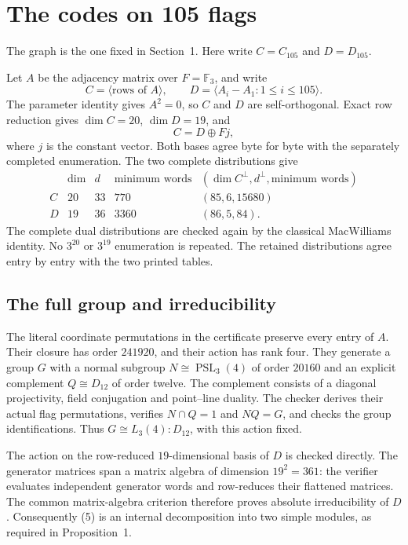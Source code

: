 \section{The codes on 105 flags}

The graph is the one fixed in Section~1. Here write $C=C_{105}$ and
$D=D_{105}$.

Let $A$ be the adjacency matrix over $F=\mathbb F_3$, and write
\[
 C=\langle\text{rows of }A\rangle,
 \qquad D=\langle A_i-A_1:1\leq i\leq105\rangle.
\]
The parameter identity gives $A^2=0$, so $C$ and $D$ are self-orthogonal.
Exact row reduction gives $\dim C=20$, $\dim D=19$, and
\[
 C=D\oplus Fj,                                      \tag{5}
\]
where $j$ is the constant vector. Both bases agree byte for byte with the
separately completed enumeration. The two complete distributions give
\[
\begin{array}{c|rrrr}
 &\dim&d&\text{minimum words}&(\dim C^\perp,d^\perp,\text{minimum words})\\\hline
 C&20&33&770&(85,6,15680)\\
 D&19&36&3360&(86,5,84).
\end{array}
\]
The complete dual distributions are checked again by the classical
MacWilliams identity. No $3^{20}$ or $3^{19}$ enumeration is repeated.
The retained distributions agree entry by entry with the two printed
tables.

\subsection{The full group and irreducibility}
The literal coordinate permutations in the certificate preserve every
entry of $A$. Their closure has order $241920$, and their action has
rank four. They generate a group $G$ with a normal subgroup
$N\cong\operatorname{PSL}_3(4)$ of order $20160$ and an explicit
complement $Q\cong D_{12}$ of order twelve. The complement consists of
a diagonal projectivity, field conjugation and point--line duality.
The checker derives their actual flag permutations, verifies
$N\cap Q=1$ and $NQ=G$, and checks the group identifications.
Thus $G\cong L_3(4):D_{12}$, with this action fixed.

The action on the row-reduced $19$-dimensional basis of $D$ is checked
directly. The generator matrices span a matrix algebra of dimension
$19^2=361$: the verifier evaluates independent generator words and
row-reduces their flattened matrices. The common matrix-algebra criterion \cite[Theorem~6.2]{U} therefore proves absolute irreducibility of $D$. Consequently (5) is an internal decomposition into two simple
modules, as required in Proposition~1.

